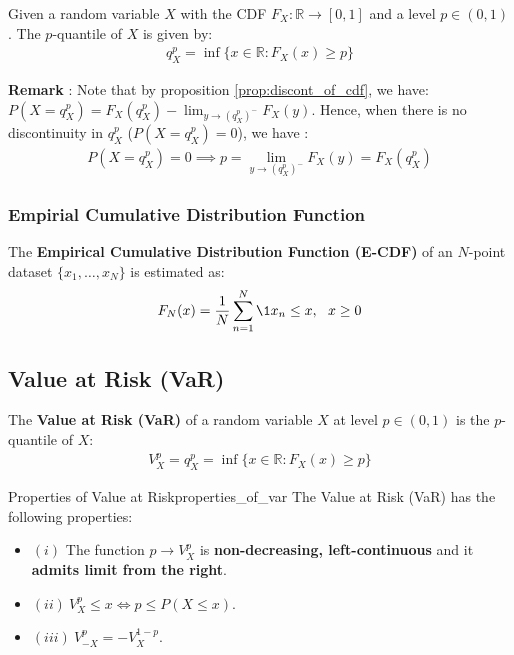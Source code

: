 \begin{definition}[Quantile]
    Given a random variable $X$ with the CDF $F_X:\mathbb{R}\to[0,1]$ and a level $p\in(0,1)$. The $p$-quantile of $X$ is given by:
    \begin{align*}
        q_X^p = \inf\Big\{x\in\mathbb{R} : F_X(x) \ge p\Big\}
    \end{align*}
\end{definition}

\noindent\newline \textbf{Remark} : Note that by proposition \ref{prop:discont_of_cdf}, we have:
    $P(X = q_X^p) = F_X(q_X^p) - \lim_{y \to (q_X^p)^-}F_X(y)$. Hence, when there is no discontinuity in $q_X^p$ ($P(X = q_X^p)=0$), we have :
\begin{align*}
    \boxed{
    P(X= q_X^p)=0 \implies p = \lim_{y \to (q_X^p)^-}F_X(y) = F_X(q_X^p)    
    }
\end{align*}

\subsubsection{Empirial Cumulative Distribution Function}
\begin{definition}
    The \textbf{Empirical Cumulative Distribution Function (E-CDF)} of an $N$-point dataset $\{x_1, \dots, x_N\}$ is estimated as:
    \begin{align*}
        F_N(x) = \frac{1}{N}\sum_{n=1}^N \1{x_n \le x}, \ \ x\ge0
    \end{align*}
\end{definition}

\subsection{Value at Risk (VaR)}
\begin{definition}
    The \textbf{Value at Risk (VaR)} of a random variable $X$ at level $p\in(0,1)$ is the $p$-quantile of $X$:
    \begin{align*}
        \boxed{
            V_X^p = q_X^p = \inf\Big\{
                x \in \mathbb{R} : F_X(x) \ge p
            \Big\}
        }
    \end{align*}
\end{definition}

\begin{proposition}{Properties of Value at Risk}{properties_of_var}
    The Value at Risk (VaR) has the following properties:
    \begin{itemize}
        \item $(i)$ The function $p\to V_X^p$ is \textbf{non-decreasing, left-continuous} and it \textbf{admits limit from the right}.
        \item $(ii) \ V_X^p \le x \iff p\le P(X\le x)$.
        \item $(iii) \ V_{-X}^p = -V_X^{1-p}$.
    \end{itemize}
\end{proposition}


